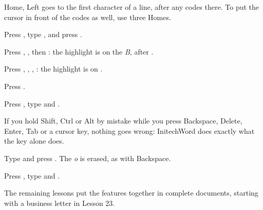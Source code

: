 Home, Left goes to the first character of a line, after any codes there.
To put the cursor in front of the codes as well, use three Homes.
\begin{WPSteps}
\item Press , type , and press
.
\item Press , , then
: the highlight is on the \textit{B}, after
\Code{[BOLD]}.
\item Press , , ,
: the highlight is on \Code{[BOLD]}.
\end{WPSteps}
\begin{WPSteps}[resume]
\item Press .
\item Press , type  and .
\end{WPSteps}

If you hold Shift, Ctrl or Alt by mistake while you press Backspace, Delete,
Enter, Tab or a cursor key, nothing goes wrong: InitechWord does exactly
what the key alone does.
\begin{WPSteps}
\item Type  and press .  The
\textit{o} is erased, as with Backspace.
\item Press , type  and .
\end{WPSteps}
\EndReplay
The remaining lessons put the features together in complete documents,
starting with a business letter in Lesson 23.
